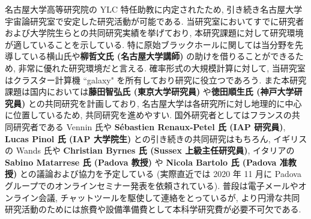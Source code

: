 \documentclass[11pt,a4paper,uplatex,dvipdfmx]{ujarticle} 		%
\newcommand{\研究課題名}{確率解析・原始ブラックホール・重力波観測から迫るインフレーション}
\newcommand{\研究機関名}{名古屋大学}
\newcommand{\研究代表者氏名}{多田祐一郎}
\newcommand{\研究期間の最終元号年度}{6}  %
\renewcommand{\emph}[1]{{\sffamily\gtfamily\bfseries #1}}
\begin{document}
\noindent
名古屋大学高等研究院の YLC 特任助教に内定されたため, 引き続き名古屋大学宇宙論研究室で安定した研究活動が可能である.
当研究室においてすでに研究者および大学院生らとの共同研究実績を挙げており, 本研究課題に対して研究環境が適していることを示している.
特に原始ブラックホールに関しては当分野を先導している横山氏や\emph{柳哲文氏 (名古屋大学講師)} の助けを借りることができるため, 非常に優れた研究環境だと言える.
確率形式の大規模計算に対して, 当研究室はクラスター計算機 ``galaxy" を所有しており研究に役立つであろう.
また本研究課題は国内においては\emph{藤田智弘氏 (東京大学研究員)} や\emph{徳田順生氏 (神戸大学研究員)} との共同研究を計画しており,
名古屋大学は各研究所に対し地理的に中心に位置しているため, 共同研究を進めやすい.
国外研究者としてはフランスの共同研究者である Vennin 氏や \emph{S\'ebastien Renaux-Petel 氏 (IAP 研究員)}, \emph{Lucas Pinol 氏 (IAP 大学院生)} との引き続きの共同研究はもちろん,
イギリスの Wands 氏や \emph{Christian Byrnes 氏 (Sussex 上級主任研究員)}, イタリアの \emph{Sabino Matarrese 氏 (Padova 教授)} や \emph{Nicola Bartolo 氏 (Padova 准教授)}
との議論および協力を予定している (実際直近では 2020 年 11 月に Padova グループでのオンラインセミナー発表を依頼されている).
普段は電子メールやオンライン会議, チャットツールを駆使して連絡をとっているが, より円滑な共同研究活動のためには旅費や設備準備費として本科学研究費が必要不可欠である.



\bigskip
\end{document}
